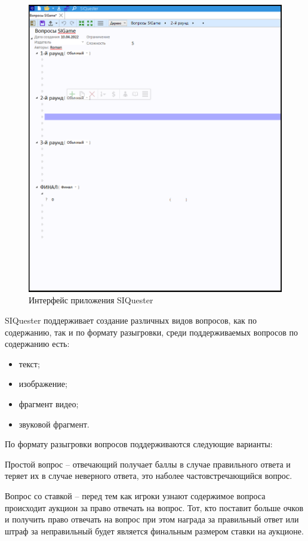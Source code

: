 \begin{figure}[!ht]
	\centering
	\includegraphics[scale=0.65]{attachments/siquester.png}  
	\caption{Интерфейс приложения SIQuester}
	\label{sec:analysis:analogues:create_quest:siquester}
\end{figure}

SIQuester поддерживает создание различных видов вопросов, как по содержанию, так и по формату разыгровки, среди поддерживаемых вопросов по содержанию есть:

\begin{itemize}
	\item текст;
	\item изображение;
	\item фрагмент видео;
	\item звуковой фрагмент.
\end{itemize} 

По формату разыгровки вопросов поддерживаются следующие варианты:

Простой вопрос -- отвечающий получает баллы в случае правильного ответа и теряет их в случае неверного ответа, это наболее частовстречающийся вопрос.

Вопрос со ставкой -- перед тем как игроки узнают содержимое вопроса происходит аукцион за право отвечать на вопрос. Тот, кто поставит больше очков и получить право отвечать на вопрос
при этом награда за правильный ответ или штраф за неправильный будет является финальным размером ставки на аукционе.

